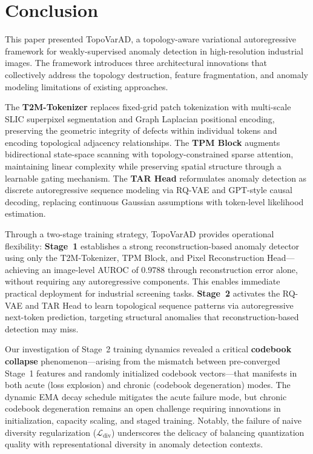 \documentclass[lettersize,journal]{IEEEtran}
\begin{document}
\section{Conclusion}
\label{sec:conclusion}

This paper presented TopoVarAD, a topology-aware variational autoregressive framework for weakly-supervised anomaly detection in high-resolution industrial images. The framework introduces three architectural innovations that collectively address the topology destruction, feature fragmentation, and anomaly modeling limitations of existing approaches.

The \textbf{T2M-Tokenizer} replaces fixed-grid patch tokenization with multi-scale SLIC superpixel segmentation and Graph Laplacian positional encoding, preserving the geometric integrity of defects within individual tokens and encoding topological adjacency relationships. The \textbf{TPM Block} augments bidirectional state-space scanning with topology-constrained sparse attention, maintaining linear complexity while preserving spatial structure through a learnable gating mechanism. The \textbf{TAR Head} reformulates anomaly detection as discrete autoregressive sequence modeling via RQ-VAE and GPT-style causal decoding, replacing continuous Gaussian assumptions with token-level likelihood estimation.

Through a two-stage training strategy, TopoVarAD provides operational flexibility: \textbf{Stage~1} establishes a strong reconstruction-based anomaly detector using only the T2M-Tokenizer, TPM Block, and Pixel Reconstruction Head---achieving an image-level AUROC of $0.9788$ through reconstruction error alone, without requiring any autoregressive components. This enables immediate practical deployment for industrial screening tasks. \textbf{Stage~2} activates the RQ-VAE and TAR Head to learn topological sequence patterns via autoregressive next-token prediction, targeting structural anomalies that reconstruction-based detection may miss.

Our investigation of Stage~2 training dynamics revealed a critical \textbf{codebook collapse} phenomenon---arising from the mismatch between pre-converged Stage~1 features and randomly initialized codebook vectors---that manifests in both acute (loss explosion) and chronic (codebook degeneration) modes. The dynamic EMA decay schedule mitigates the acute failure mode, but chronic codebook degeneration remains an open challenge requiring innovations in initialization, capacity scaling, and staged training. Notably, the failure of naive diversity regularization ($\mathcal{L}_{\text{div}}$) underscores the delicacy of balancing quantization quality with representational diversity in anomaly detection contexts.
\end{document}
